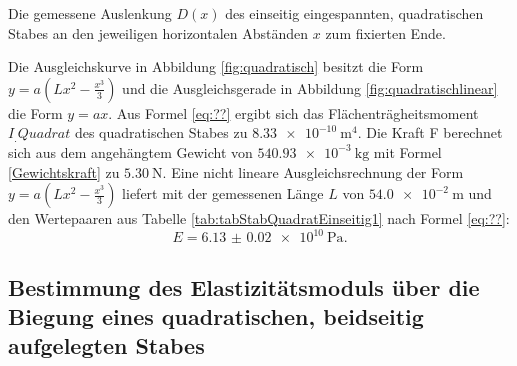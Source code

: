 \begin{table}
	\caption{Die gemessene Auslenkung $D(x)$ des einseitig eingespannten, quadratischen Stabes an den jeweiligen horizontalen Abständen $x$ zum fixierten Ende.}
	\begin{minipage}{0.5\textwidth}
		\centering
		
	\end{minipage}
	\begin{minipage}{0.5\textwidth}
		\centering
		
	\end{minipage}
\end{table}
Die Ausgleichskurve in Abbildung \ref{fig:quadratisch} besitzt die Form $y = a ( L x^2 - \frac{x^3}{3} ) $ und die Ausgleichsgerade in Abbildung \ref{fig:quadratischlinear} die Form $y=a x$. Aus Formel \eqref{eq:??} ergibt sich das Flächenträgheitsmoment $I_.{Quadrat}$ des quadratischen Stabes zu $\SI{8.33e-10}{\metre\tothe{4}}$. Die Kraft F berechnet sich aus dem angehängtem Gewicht von $\SI{540,93e-3}{\kilogram}$ mit Formel \eqref{Gewichtskraft} zu $\SI{5.30}{\newton}$. Eine nicht lineare Ausgleichsrechnung der Form $y = a ( L x^2 - \frac{x^3}{3})$ liefert mit der gemessenen Länge $L$ von $\SI{54.0e-2}{\metre}$ und den Wertepaaren aus Tabelle \ref{tab:tabStabQuadratEinseitig1} nach Formel \eqref{eq:??}:
\begin{displaymath}
E = \SI{6.13(2)e10}{\pascal}\text{.}
\end{displaymath}

\subsection{Bestimmung des Elastizitätsmoduls über die Biegung eines quadratischen, beidseitig aufgelegten Stabes}

